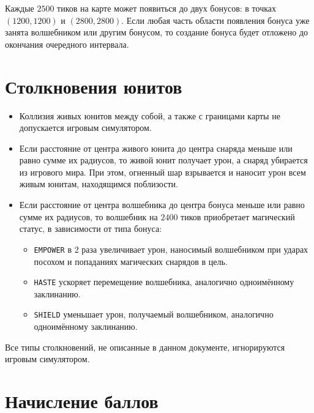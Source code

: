 Каждые $2500$ тиков на карте может появиться до двух бонусов: в точках $(1200, 1200)$ и $(2800, 2800)$. Если любая часть области появления
бонуса уже занята волшебником или другим бонусом, то создание бонуса будет отложено до окончания очередного интервала.

\section{Столкновения юнитов}

\begin{itemize}
  \item Коллизия живых юнитов между собой, а также с границами карты не допускается игровым симулятором.
  \item Если расстояние от центра живого юнита до центра снаряда меньше или равно сумме их радиусов, то живой юнит получает урон, а снаряд
        убирается из игрового мира. При этом, огненный шар взрывается и наносит урон всем живым юнитам, находящимся поблизости.
  \item Если расстояние от центра волшебника до центра бонуса меньше или равно сумме их радиусов, то волшебник на $2400$ тиков приобретает
        магический статус, в зависимости от типа бонуса:
        \begin{itemize}
            \item \texttt{EMPOWER} в $2$ раза увеличивает урон, наносимый волшебником при ударах посохом и попаданиях магических снарядов
                  в цель.
            \item \texttt{HASTE} ускоряет перемещение волшебника, аналогично одноимённому заклинанию.
            \item \texttt{SHIELD} уменьшает урон, получаемый волшебником, аналогично одноимённому заклинанию.
        \end{itemize}
\end{itemize}

Все типы столкновений, не описанные в данном документе, игнорируются игровым симулятором.

\section{Начисление баллов}

